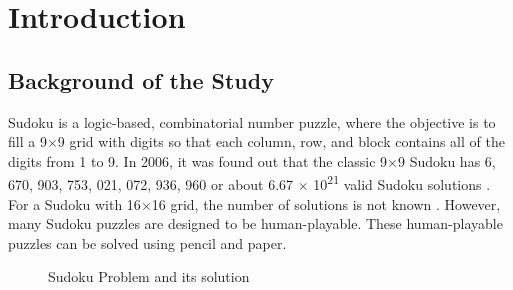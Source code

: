 \documentclass[a4paper,oneside,11pt]{report}
\newcounter{row}
\newcounter{col}
\begin{document}



\tableofcontents


\newpage

\doublespacing

\chapter{Introduction}

\section{Background of the Study}
Sudoku is a logic-based, combinatorial number puzzle, where the objective is to fill a 9$\times$9 grid with digits so that each column, row, and block contains all of the digits from 1 to 9. In 2006, it was found out that the classic 9$\times$9 Sudoku has 6, 670, 903, 753, 021, 072, 936, 960 or about 6.67 $\times$ 10\textsuperscript{21} valid Sudoku solutions \cite{Felgenhauer}. For a Sudoku with 16$\times$16 grid, the number of solutions is not known \cite{Kapanowski}. However, many Sudoku puzzles are designed to be human-playable. These human-playable puzzles can be solved using pencil and paper.

\begin{figure}[h]
  \centering
  \hspace{3cm}
  \caption{Sudoku Problem and its solution}
\end{figure}
\end{document}

